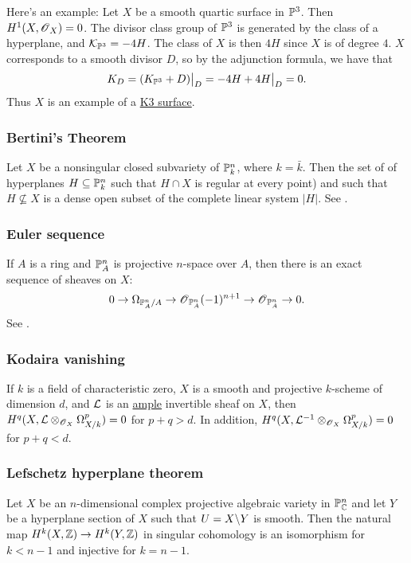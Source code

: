 \documentclass[11pt, english]{article}
\begin{document}
Here's an example: Let $X$ be a smooth quartic surface in $\mathbb{P}^3$. Then $H^1(X,\operatorname{\mathscr{O}}_X)=0$. The divisor class group of $\mathbb{P}^3$ is generated by the class of a hyperplane, and $\mathcal K_{\mathbb{P}^3}=-4H$. The class of $X$ is then $4H$ since $X$ is of degree $4$. $X$ corresponds to a smooth divisor $D$, so by the adjunction formula, we have that
\[
K_D = \restr{(K_{\PP^3}+D)}{D} = \restr{-4H+4H}{D} = 0.
\]
Thus $X$ is an example of a \hyperref[k3]{K3 surface}. 


\subsubsection{Bertini's Theorem}
\label{bertini}
Let $X$ be a nonsingular closed subvariety of $\mathbb{P}_k^n$, where $k=\bar k$. Then the set of of hyperplanes $H \subseteq \mathbb{P}_k^n$ such that $H \cap X$ is regular at every point) and such that $H\not  \subseteq X$ is a dense open subset of the complete linear system $|H|$. See \cite[Thm II.8.18]{hartshorne}.

\subsubsection{Euler sequence}
\label{eulersequence}
If $A$ is a ring and $\mathbb{P}_A^n$ is projective $n$-space over $A$, then there is an exact sequence of sheaves on $X$:
\[
0 \to \Omega_{\mathbb{P}^n_A/A} \to \operatorname{\mathscr{O}}_{\mathbb{P}^n_A}(-1)^{n+1} \to \operatorname{\mathscr{O}}_{\mathbb{P}_A^n} \to 0.
\]
See \cite[Thm II.8.13]{hartshorne}.

\subsubsection{Kodaira vanishing}
\label{kodairavanishing}
If $k$ is a field of characteristic zero, $X$ is a smooth and projective $k$-scheme of dimension $d$, and $\mathcal{L}$ is an \hyperref[amplelinebundle]{ample} invertible sheaf on $X$, then ${H^q(X,{\mathcal{L} \otimes_{\operatorname{\mathscr{O}}_X} \Omega^p_{X/k}})=0}$ for $p+q > d$. In addition, $H^q(X,\mathcal{L}^{-1} \otimes_{\operatorname{\mathscr{O}}_X} \Omega_{X/k}^p)=0$ for $p+q < d$. 

\subsubsection{Lefschetz hyperplane theorem}
\label{lefschetz} 
Let $X$ be an $n$-dimensional complex projective algebraic variety in $\mathbb{P}_{\mathbb{C}}^n$ and let $Y$ be a hyperplane section of $X$ such that $U=X \backslash Y$ is smooth. Then the natural map $H^k(X,\mathbb{Z}) \to H^k(Y,\mathbb{Z})$ in singular cohomology is an isomorphism for $k<n-1$ and injective for $k=n-1$.
\end{document}
